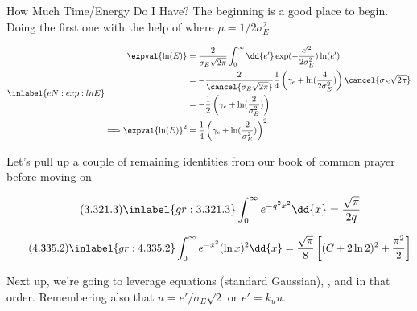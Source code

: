 \begin{answer}
\begin{answerpart}{How Much Time/Energy Do I Have?}
    The beginning is a good place to begin.  Doing the first one with
    the help of  where $\mu = 1/2\sigma_E^2$

    \begin{equation}
      \inlabel{eN:exp:lnE}
      \begin{alignedat}{2}
        &&\expval{\ln(E)}
        &= \frac{2}{\sigma_E\sqrt{2\pi}}
        \int_0^\infty \dd{e'}
        \exp(-\frac{e'^2}{2\sigma_E^2})
        \ln(e')
        \\
        &&&=
        -
        \frac{2}{\cancel{\sigma_E\sqrt{2\pi}}}
        \frac{1}{4}\left(\gamma_e + \ln(\frac{4}{2\sigma_E^2})\right)
        \cancel{\sigma_E\sqrt{2\pi}}
        \\
        &&&=
        -\frac{1}{2}
        \left(\gamma_e + \ln(\frac{2}{\sigma_E^2})\right)
        \\
        \implies && \expval{\ln(E)}^2
        &=
        \frac{1}{4}
        \left(\gamma_e + \ln(\frac{2}{\sigma_E^2})\right)^2
        \\
      \end{alignedat}
    \end{equation}

    Let's pull up a couple of remaining identities from our book of
    common prayer before moving on

    \begin{equation}
      \tag{3.321.3}
      \inlabel{gr:3.321.3}
      \int_0^{\infty} e^{-q^2x^2}\dd{x} = \frac{\sqrt{\pi}}{2q}
    \end{equation}\cite[eq3.321.3]{gr}

    \begin{equation}
      \tag{4.335.2}
      \inlabel{gr:4.335.2}
      \int_0^{\infty} e^{-x^2}(\ln x)^2\dd{x}
      = \frac{\sqrt{\pi}}{8}
      \left[
        (C + 2\ln 2)^2
        + \frac{\pi^2}{2}
        \right]
    \end{equation}\cite[eq4.335.2]{gr}
    
    Next up, we're going to leverage equations 
    (standard Gaussian), , and  in
    that order.  Remembering also that $u = e'/\sigma_E\sqrt{2}$ or
    $e' = k_uu$.


\end{answerpart}
\end{answer}
